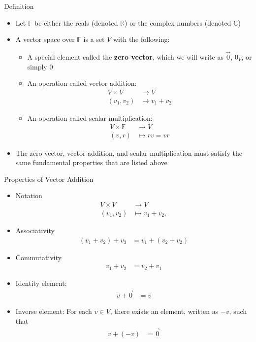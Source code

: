 \documentclass[usenames,dvipsnames,10pt]{beamer}
\newcommand\C{\mathbb{C}}
\newcommand\F{\mathbb{F}}
\newcommand{\R}{\mathbb{R}}
\newcommand\zero{\vec{0}}
\begin{document}
\begin{frame}
  {Definition}

  \begin{itemize}
  \item Let $\F$ be either the reals (denoted $\R$) or the complex numbers (denoted $\C$)
  \item 
    A vector space over $\F$ is a set $V$ with the following:
    \begin{itemize}
    \item A special element called the {\bf zero vector}, which we will write as $\zero$, $0_V$, or simply $0$
    \item An operation called vector addition:
      \begin{align*}
        V \times V &\rightarrow V\\
        (v_1, v_2) &\mapsto v_1 + v_2
      \end{align*}
    \item An operation called scalar multiplication:
      \begin{align*}
        V\times \F &\rightarrow V\\
        (v, r) &\mapsto rv = vr
      \end{align*}
    \end{itemize}
  \item The zero vector, vector addition, and scalar multiplication must satisfy the same fundamental properties that are listed above
  \end{itemize}
\end{frame}

\begin{frame}
  {Properties of Vector Addition}
  \begin{itemize}
  \item Notation
    \begin{align*}
      V \times V &\rightarrow V\\
      (v_1,v_2) &\mapsto v_1 + v_2,
    \end{align*}
  \item Associativity
    \begin{align*}
      (v_1+ v_2)+ v_3 &= v_1+(v_2+ v_2)
    \end{align*}
  \item Commutativity
    \begin{align*}
      v_1 + v_2 &= v_2 + v_1
    \end{align*}
  \item Identity element:
    \begin{align*}
      v + \zero &= v
    \end{align*}
  \item Inverse element: For each $v \in V$, there exists an element, written as $-v$, such that
    \begin{align*}
      v + (-v) &= \zero
    \end{align*}
  \end{itemize}
\end{frame}
\end{document}
